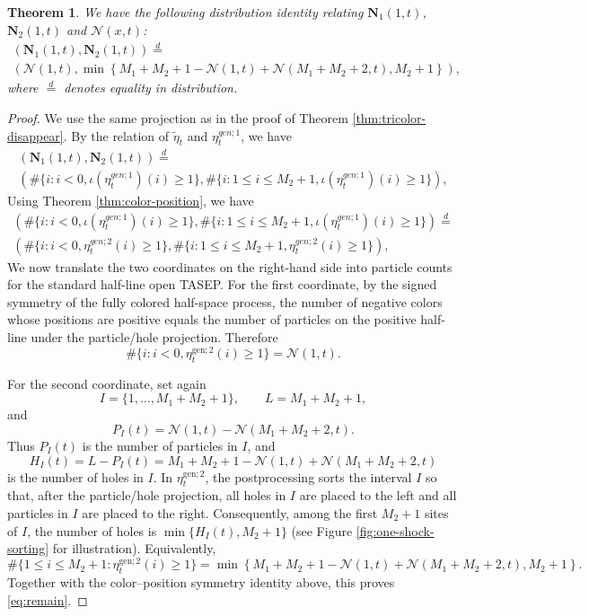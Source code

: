 \documentclass[12pt,a4paper]{amsart}
\newtheorem{theorem}{Theorem} %
\theoremstyle{remark}
\numberwithin{equation}{section} \numberwithin{theorem}{section}
\begin{document}
\begin{theorem}
\label{thm:tricolor-height}
We have the following distribution identity relating $\mathbf{N}_{1}(1,t)$, $\mathbf{N}_{2}(1,t)$ and $\mathcal{N}(x,t)$:
\begin{multline}
\label{eq:remain}
\left(\mathbf{N}_{1}(1,t) , \mathbf{N}_{2}(1,t) \right) \stackrel{d}{=} \\ 
\left( \mathcal{N}(1, t) , \min \left\{M_1+M_2+1- \mathcal{N}(1, t) + \mathcal{N}(M_1 + M_{2}+2, t), M_{2}+1 \right\} \right),
\end{multline}
where $\stackrel{d}{=}$ denotes equality in distribution.
\end{theorem}

\begin{proof}
We use the same projection as in the proof of Theorem \ref{thm:tricolor-disappear}. 
By the relation of $\tilde\eta_t$ and $\eta_{t}^{gen;1}$, we have
\begin{multline*}
\left(\mathbf{N}_{1} (1,t) , \mathbf{N}_{2} (1,t) \right) \stackrel{d}{=} \\ 
\left( \#\{i: i<0, \iota( \eta_{t}^{gen;1})(i) \geq 1\},  \#\{i: 1 \leq i \leq M_2+1, \iota( \eta_{t}^{gen;1})(i) \geq 1\}\right),
\end{multline*}
Using Theorem \ref{thm:color-position}, we have
\begin{multline*}
\left( \#\{i: i<0, \iota( \eta_{t}^{gen;1})(i) \geq 1\},  \#\{i: 1 \leq i \leq M_2+1, \iota( \eta_{t}^{gen;1})(i) \geq 1\}\right) \stackrel{d}{=} \\
\left( \#\{i: i<0, \eta_{t}^{gen;2}(i) \geq 1\},  \#\{i: 1 \leq i \leq M_2+1, \eta_{t}^{gen;2}(i) \geq 1\}\right),
\end{multline*}
We now translate the two coordinates on the right-hand side into particle counts for the standard half-line open TASEP. 
For the first coordinate, by the signed symmetry of the fully colored half-space process, the number of negative colors whose positions are positive equals the number of particles on the positive half-line under the particle/hole projection. 
Therefore
\[
\#\{i: i<0,\eta_t^{\mathrm{gen};2}(i)\geq 1\}
=
\mathcal N(1,t).
\]

For the second coordinate, set again
\[
I=\{1,\ldots,M_1+M_2+1\},\qquad L=M_1+M_2+1,
\]
and
\[
P_I(t)=\mathcal N(1,t)-\mathcal N(M_1+M_2+2,t).
\]
Thus $P_I(t)$ is the number of particles in $I$, and
\[
H_I(t)=L-P_I(t)
=
M_1+M_2+1-\mathcal N(1,t)+\mathcal N(M_1+M_2+2,t)
\]
is the number of holes in $I$. 
In $\eta_t^{\mathrm{gen};2}$, the postprocessing sorts the interval $I$ so that, after the particle/hole projection, all holes in $I$ are placed to the left and all particles in $I$ are placed to the right. 
Consequently, among the first $M_2+1$ sites of $I$, the number of holes is
$\min\{H_I(t),M_2+1\}$ (see Figure \ref{fig:one-shock-sorting} for illustration).
Equivalently,
\[
\#\{1\leq i\leq M_2+1:\eta_t^{\mathrm{gen};2}(i)\geq 1\}
=
\min \left\{
M_1+M_2+1-\mathcal N(1,t)+\mathcal N(M_1+M_2+2,t),
M_2+1
\right\}.
\]
Together with the color--position symmetry identity above, this proves \eqref{eq:remain}.
\end{proof}
\end{document}
